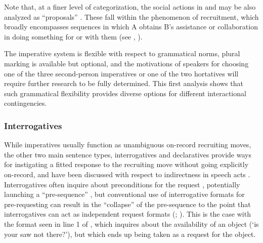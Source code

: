 \documentclass[output=paper]{langsci/langscibook}
\begin{document}
Note that, at a finer level of categorization, the social actions in  and  may be also analyzed as “proposals” \citep{couper-kuhlen_what_2014,StiversSidnell2016}. These fall within the phenomenon of recruitment, which broadly encompasses sequences in which A obtains B’s assistance or collaboration in doing something for or with them (see , ).

The imperative system is flexible with respect to grammatical norms, plural marking is available but optional, and the motivations of speakers for choosing one of the three second-person imperatives or one of the two hortatives will require further research to be fully determined. This first analysis shows that such grammatical flexibility provides diverse options for different interactional contingencies.

\subsubsection{Interrogatives}\label{sec:floyd:3.3.3}

While imperatives usually function as unambiguous on-record recruiting moves, the other two main sentence types, interrogatives and declaratives provide ways for instigating a fitted response to the recruiting move without going explicitly on-record, and have been discussed with respect to indirectness in speech acts \citep{Searle1969}. Interrogatives often inquire about preconditions for the request \citep{Levinson1983}, potentially launching a “pre-sequence” \citep{Schegloff1980,schegloff_sequence_2007,Rossi2015b}, but conventional use of interrogative formats for pre-requesting can result in the “collapse” of the pre-sequence to the point that interrogatives can act as independent request formats (\citealt{Levinson1983}; \citealt{Fox2015}). This is the case with the format seen in line 1 of , which inquires about the availability of an object (‘is your saw not there?’), but which ends up being taken as a request for the object.
\end{document}
